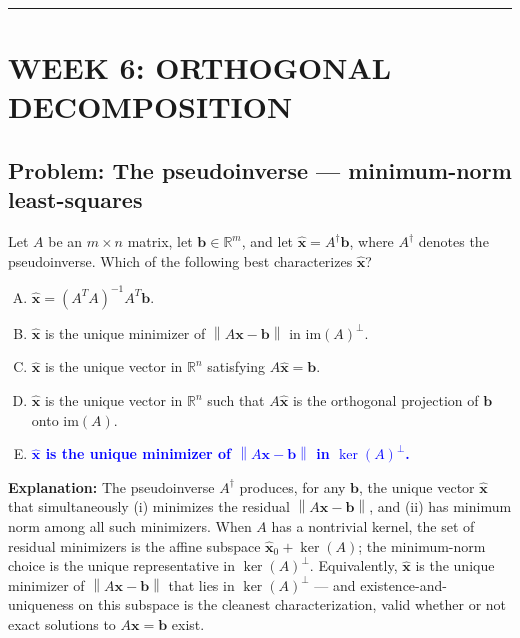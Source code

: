 \documentclass[12pt]{amsart}
\newcommand{\divider}{
  \vspace{-1em}
  \noindent
  \raisebox{-0.15ex}{\textbullet}%
  \hspace{0.5em}%
  \rule[0.5ex]{0.95\textwidth}{1.0pt}%
  \hspace{0.5em}%
  \raisebox{-0.15ex}{\textbullet}%
  \vspace{0em}
}
\newcommand{\norm}[1]{\left\|#1\right\|}
\begin{document}
\divider

\section*{WEEK 6: ORTHOGONAL DECOMPOSITION}

\subsection*{Problem: The pseudoinverse --- minimum-norm least-squares}

Let $A$ be an $m \times n$ matrix, let $\mathbf{b} \in \mathbb{R}^m$, and let
$\hat{\mathbf{x}} = A^\dagger \mathbf{b}$, where $A^\dagger$ denotes the
pseudoinverse. Which of the following best characterizes $\hat{\mathbf{x}}$?

\begin{enumerate}[(A)]
\item $\hat{\mathbf{x}} = (A^T A)^{-1} A^T \mathbf{b}$.
\item $\hat{\mathbf{x}}$ is the unique minimizer of $\norm{A\mathbf{x} - \mathbf{b}}$ in $\mathrm{im}(A)^\perp$.
\item $\hat{\mathbf{x}}$ is the unique vector in $\mathbb{R}^n$ satisfying $A\hat{\mathbf{x}} = \mathbf{b}$.
\item $\hat{\mathbf{x}}$ is the unique vector in $\mathbb{R}^n$ such that $A\hat{\mathbf{x}}$ is the orthogonal projection of $\mathbf{b}$ onto $\mathrm{im}(A)$.
\item \textcolor{blue}{\textbf{$\hat{\mathbf{x}}$ is the unique minimizer of $\norm{A\mathbf{x} - \mathbf{b}}$ in $\ker(A)^\perp$.}}
\end{enumerate}

\textbf{Explanation:}
The pseudoinverse $A^\dagger$ produces, for any $\mathbf{b}$, the unique
vector $\hat{\mathbf{x}}$ that simultaneously (i) minimizes the residual
$\norm{A\mathbf{x} - \mathbf{b}}$, and (ii) has minimum norm among all such
minimizers. When $A$ has a nontrivial kernel, the set of residual minimizers
is the affine subspace $\hat{\mathbf{x}}_0 + \ker(A)$; the minimum-norm
choice is the unique representative in $\ker(A)^\perp$. Equivalently,
$\hat{\mathbf{x}}$ is the unique minimizer of $\norm{A\mathbf{x} - \mathbf{b}}$
that lies in $\ker(A)^\perp$ --- and existence-and-uniqueness on this
subspace is the cleanest characterization, valid whether or not exact
solutions to $A\mathbf{x} = \mathbf{b}$ exist.
\end{document}
